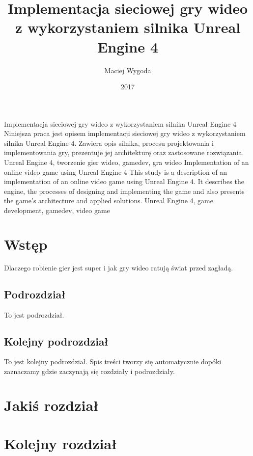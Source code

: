 \documentclass[multip]{SGGW-thesis}
\title{Implementacja sieciowej gry wideo z wykorzystaniem silnika Unreal Engine 4}
\author{Maciej Wygoda}
\date{2017}
\begin{document}
\maketitle
{}
\statementpage
\abstractpage
{Implementacja sieciowej gry wideo z wykorzystaniem silnika Unreal Engine 4}
{Niniejsza praca jest opisem implementacji sieciowej gry wideo z wykorzystaniem silnika Unreal Engine 4. Zawiera opis silnika, procesu projektowania i implementowania gry, prezentuje jej architekturę oraz zastosowane rozwiązania.}
{Unreal Engine 4, tworzenie gier wideo, gamedev, gra wideo}
{Implementation of an online video game using Unreal Engine 4}
{This study is a description of an implementation of an online video game using Unreal Engine 4. It describes the engine, the processes of designing and implementing the game and also presents the game's architecture and applied solutions.}
{Unreal Engine 4, game development, gamedev, video game}

\tableofcontents

\chapter{Wstęp}
Dlaczego robienie gier jest super i jak gry wideo ratują świat przed zagładą.

\section{Podrozdział}
To jest podrozdział.

\section{Kolejny podrozdział}
To jest kolejny podrozdział. Spis treści tworzy się automatycznie dopóki zaznaczamy gdzie zaczynają się rozdziały i podrozdziały.

\chapter{Jakiś rozdział}

\chapter{Kolejny rozdział}
\end{document}
